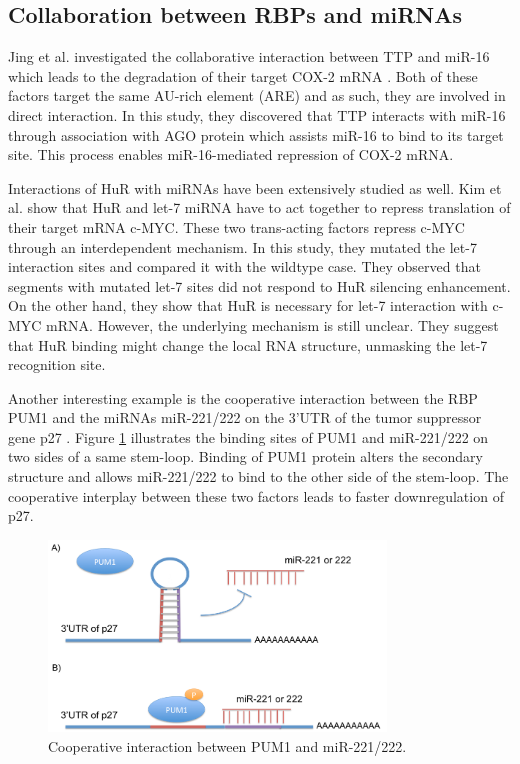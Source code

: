 \subsection{Collaboration between RBPs and miRNAs}

Jing et al. investigated the collaborative interaction between TTP and miR-16 which leads to the degradation of their target COX-2 mRNA \cite{jing_2005}. Both of these factors target the same AU-rich element (ARE) and as such, they are involved in direct interaction. In this study, they discovered that TTP interacts with miR-16 through association with AGO protein which assists miR-16 to bind to its target site. This process enables miR-16-mediated repression of COX-2 mRNA.

Interactions of HuR with miRNAs have been extensively studied as well. Kim et al. \cite{kim_2009} show that HuR and let-7 miRNA have to act together to repress translation of their target mRNA c-MYC. These two trans-acting factors repress c-MYC through an interdependent mechanism. In this study, they mutated the let-7 interaction sites and compared it with the wildtype case. They observed that segments with mutated let-7 sites did not respond to HuR silencing enhancement. On the other hand, they show that HuR is necessary for let-7 interaction with c-MYC mRNA. However, the underlying mechanism is still unclear. They suggest that HuR binding might change the local RNA structure, unmasking the let-7 recognition site.

Another interesting example is the cooperative interaction between the RBP PUM1 and the miRNAs miR-221/222 on the 3’UTR of the tumor suppressor gene p27 \cite{kedde_10}. Figure \ref{pum_miR-221} illustrates the binding sites of PUM1 and miR-221/222 on two sides of a same stem-loop. Binding of PUM1 protein alters the secondary structure and allows miR-221/222 to bind to the other side of the stem-loop. The cooperative interplay between these two factors leads to faster downregulation of p27.

\begin{figure}[H]
   \centering
   \includegraphics[width=0.8\textwidth,clip]{ch2_background/figures/pum_miR221.pdf}

\caption[Cooperative interaction between PUM1 and miR-221/222]{Cooperative interaction between PUM1 and miR-221/222.}
\label{pum_miR-221}
\end{figure}

